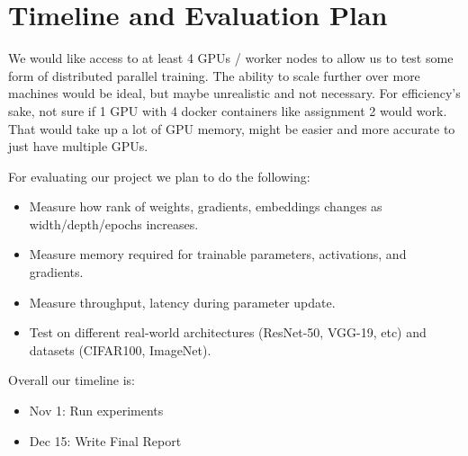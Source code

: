 \documentclass[pdftex,twocolumn,10pt,letterpaper]{article}
\begin{document}
\section{Timeline and Evaluation Plan}

We would like access to at least 4 GPUs / worker nodes to allow us to test some form of distributed parallel training. The ability to scale further over more machines would be ideal, but maybe unrealistic and not necessary. For efficiency's sake, not sure if 1 GPU with 4 docker containers like assignment 2 would work. That would take up a lot of GPU memory, might be easier and more accurate to just have multiple GPUs.

For evaluating our project we plan to do the following:
\begin{itemize}
  \item Measure how rank of weights, gradients, embeddings changes as width/depth/epochs increases.
  \item Measure memory required for trainable parameters, activations, and gradients.
  \item Measure throughput, latency during parameter update.
  \item Test on different real-world architectures (ResNet-50, VGG-19, etc) and datasets (CIFAR100, ImageNet).
\end{itemize}

Overall our timeline is:

\begin{itemize}
  \item Nov 1: Run experiments 
  \item Dec 15: Write Final Report
\end{itemize}

{


}
\end{document}
